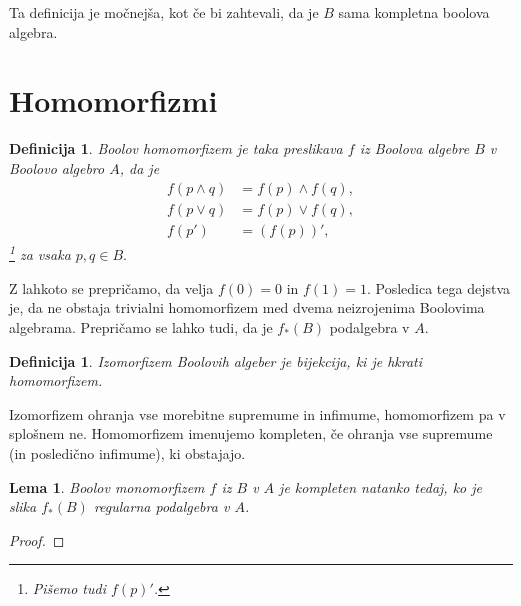\documentclass{amsart}
\newtheorem{lema}[izrek]{Lema}
\newtheorem{definicija}[izrek]{Definicija}
\begin{document}
Ta definicija je močnejša, kot če bi zahtevali, da je $B$ sama kompletna boolova algebra.


\section{Homomorfizmi}

\begin{definicija}
    Boolov homomorfizem je taka preslikava $f$ iz Boolova algebre $B$ v 
    Boolovo algebro $A$, da je 
    \begin{align*}
        f(p \wedge q) &= f(p) \wedge f(q),\\
        f(p \vee q) &= f(p) \vee f(q),\\
        f(p') &= (f(p))',
    \end{align*}\footnote{Pišemo tudi \(f(p)'\).}
    za vsaka \(p, q \in B.\)
\end{definicija}

Z lahkoto se prepričamo, da velja \(f(0) = 0\) in \(f(1) = 1\). Posledica tega dejstva je, da ne obstaja trivialni homomorfizem med dvema
neizrojenima Boolovima algebrama. Prepričamo se lahko tudi, da je \(f_{*}(B)\) podalgebra v \(A\).

\begin{definicija}
    Izomorfizem Boolovih algeber je bijekcija, ki je hkrati homomorfizem.
\end{definicija}

Izomorfizem ohranja vse morebitne supremume in infimume, homomorfizem pa 
v splošnem ne. Homomorfizem imenujemo kompleten, če ohranja vse supremume (in posledično infimume), ki obstajajo.

\begin{lema}
    Boolov monomorfizem $f$ iz $B$ v $A$ je kompleten natanko tedaj, ko 
    je slika \(f_{*}(B)\) regularna podalgebra v $A$.
\end{lema}

\begin{proof}
    
\end{proof}
\end{document}
